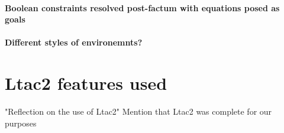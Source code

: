 \paragraph{Boolean constraints resolved post-factum with equations posed as goals}

\paragraph{Different styles of environemnts?}

\section{Ltac2 features used}

"Reflection on the use of Ltac2"
Mention that Ltac2 was complete for our purposes
